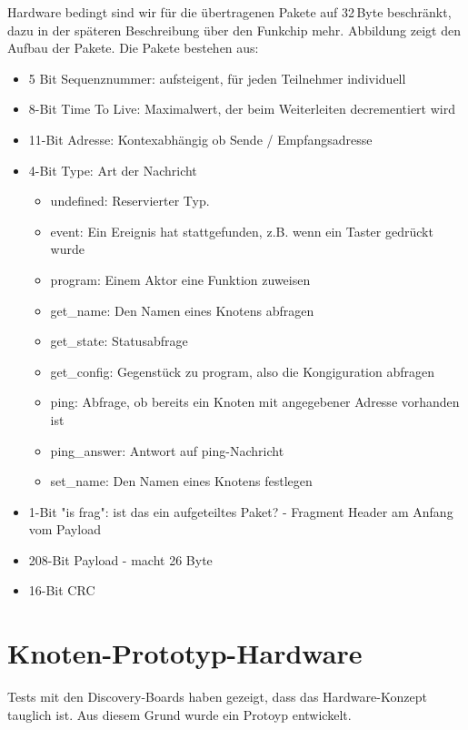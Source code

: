 \documentclass{IEEEtran}
\begin{document}
        Hardware bedingt sind wir für die übertragenen Pakete auf 32\,Byte beschränkt, dazu in der späteren Beschreibung über den Funkchip mehr. Abbildung \label{fig:paket} zeigt den Aufbau der Pakete. Die Pakete bestehen aus:
        \begin{itemize}
            \item 5 Bit Sequenznummer: aufsteigent, für jeden Teilnehmer individuell
            \item 8-Bit Time To Live: Maximalwert, der beim Weiterleiten decrementiert wird
            \item 11-Bit Adresse: Kontexabhängig ob Sende / Empfangsadresse
            \item 4-Bit Type: Art der Nachricht
            \begin{itemize}
                \item undefined: Reservierter Typ.
                \item event: Ein Ereignis hat stattgefunden, z.B. wenn ein Taster gedrückt wurde
                \item program: Einem Aktor eine Funktion zuweisen
                \item get\_name: Den Namen eines Knotens abfragen
                \item get\_state: Statusabfrage
                \item get\_config: Gegenstück zu program, also die Kongiguration abfragen
                \item ping: Abfrage, ob bereits ein Knoten mit angegebener Adresse vorhanden ist
                \item ping\_answer: Antwort auf ping-Nachricht
                \item set\_name: Den Namen eines Knotens festlegen
            \end{itemize}
            \item 1-Bit "is frag": ist das ein aufgeteiltes Paket? - Fragment Header am Anfang vom Payload
            \item 208-Bit Payload - macht 26 Byte
            \item 16-Bit CRC
        \end{itemize}

\section{Knoten-Prototyp-Hardware}
Tests mit den Discovery-Boards haben gezeigt, dass das Hardware-Konzept tauglich ist.
Aus diesem Grund wurde ein Protoyp entwickelt.
\end{document}
